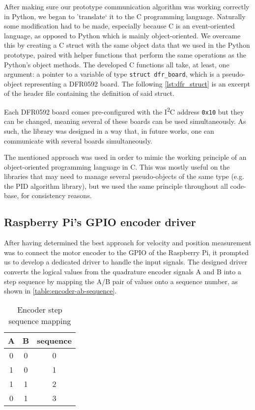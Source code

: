 After making sure our prototype communication algorithm was working correctly in Python, we began to 'translate` it to the C programming language.
Naturally some modification had to be made, especially because C is an event-oriented language, as opposed to Python which is mainly object-oriented.
We overcame this by creating a C struct with the same object data that we used in the Python prototype, paired with helper functions that perform the same operations as the Python's object methods.
The developed C functions all take, at least, one argument: a pointer to a variable of type \verb|struct dfr_board|, which is a pseudo-object representing a DFR0592 board.
The following \autoref{lst:dfr_struct} is an excerpt of the header file containing the definition of said struct.



Each DFR0592 board comes pre-configured with the I\textsuperscript{2}C address \verb|0x10| but they can be changed, meaning several of these boards can be used simultaneously.
As such, the library was designed in a way that, in future works, one can communicate with several boards simultaneously.

The mentioned approach was used in order to mimic the working principle of an object-oriented programming language in C.
This was mostly useful on the libraries that may need to manage several pseudo-objects of the same type (e.g. the PID algorithm library), but we used the same principle throughout all code-base, for consistency reasons.

\subsection{Raspberry Pi's GPIO encoder driver}
After having determined the best approach for velocity and position measurement was to connect the motor encoder to the GPIO of the Raspberry Pi, it prompted us to develop a dedicated driver to handle the input signals.
The designed driver converts the logical values from the quadrature encoder signals A and B into a step sequence by mapping the A/B pair of values onto a sequence number, as shown in \autoref{table:encoder-ab-sequence}.

\begin{table}[htp]
	\centering
	\caption{Encoder step sequence mapping}
	\label{table:encoder-ab-sequence}
	\begin{tabular}{|c|c|c|}
		\hline
		A & B & sequence  \\
		\hline
		0 & 0 & 0         \\
		\hline
		1 & 0 & 1         \\
		\hline
		1 & 1 & 2         \\
		\hline
		0 & 1 & 3         \\
		\hline
	\end{tabular}
\end{table}

